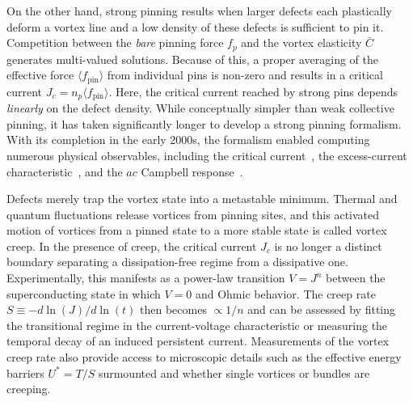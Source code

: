 \documentclass[%
 aip,
 amsmath,amssymb,
 reprint,%
floatfix]{revtex4-1}
\begin{document}
On the other hand, strong pinning results when larger defects each plastically deform a vortex line and a low density of these defects is sufficient to pin it.  Competition between the \emph{bare} pinning force $f_{p}$ and the vortex elasticity $\bar{C}$ generates multi-valued solutions. Because of this, a proper averaging of the effective force $\langle f_{\mathrm{pin}}\rangle$ from individual pins is non-zero and results in a critical current $J_{c} = n_{p} \langle f_{\mathrm{pin}}\rangle$. Here, the critical current reached by strong pins depends \emph{linearly} on the defect density. While conceptually simpler than weak collective pinning, it has taken significantly longer to develop a strong pinning formalism. With its completion in the early 2000s, the formalism enabled computing numerous physical observables, including the critical current~\cite{Blatter2004, Koopmann2004}, the excess-current characteristic~\cite{Thomann2012, Thomann2017,Buchacek2018, Buchacek2019a, Buchacek2019b, Buchacek2020-condmat}, and the $ac$ Campbell response~\cite{Willa2015a, Willa2015b, Willa2016, Willa2018c}.




Defects merely trap the vortex state into a metastable minimum.  Thermal and quantum fluctuations release vortices from pinning sites, and this activated motion of vortices from a pinned state to a more stable state is called vortex creep. In the presence of creep, the critical current $J_{c}$ is no longer a distinct boundary separating a dissipation-free regime from a dissipative one. Experimentally, this manifests as a power-law transition $V=J^n$ between the superconducting state in which $V=0$ and Ohmic behavior.  The creep rate $S \equiv - d \ln(J) / d\ln(t)$ then becomes $\propto 1/n$ and can be assessed by fitting the transitional regime in the current-voltage characteristic or measuring the temporal decay of an induced persistent current.  Measurements of the vortex creep rate also provide access to microscopic details such as the effective energy barriers $U^*=T/S$ surmounted and whether single vortices or bundles are creeping.
\end{document}
